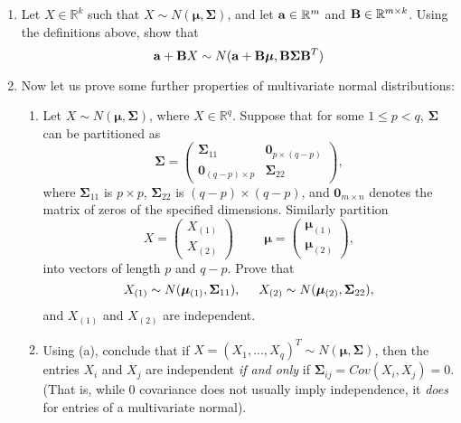 \documentclass[11pt]{article}
\begin{document}
\begin{enumerate}

\item Let $X \in \mathbb{R}^k$ such that $X \sim N(\bm{\mu}, \bm{\Sigma})$, and let ${\bf a} \in \mathbb{R}^m$ and ${\bf B} \in \mathbb{R}^{m \times k}$. Using the definitions above, show that
$${\bf a} + {\bf B} X \sim N({\bf a} + {\bf B} \bm{\mu}, {\bf B} \bm{\Sigma} {\bf B}^T)$$


\item Now let us prove some further properties of multivariate normal distributions:

\begin{enumerate}

\item Let $X \sim N(\bm{\mu}, \bm{\Sigma})$, where $X \in \mathbb{R}^q$. Suppose that for some $1 \leq p < q$, $\bm{\Sigma}$ can be partitioned as
$$\bm{\Sigma} = \begin{pmatrix}
\bm{\Sigma}_{11} & \bm{0}_{p \times (q - p)} \\
\bm{0}_{(q - p) \times p} & \bm{\Sigma}_{22}
\end{pmatrix},$$
where $\bm{\Sigma}_{11}$ is $p \times p$, $\bm{\Sigma}_{22}$ is $(q - p) \times (q - p)$, and $\bm{0}_{m \times n}$ denotes the matrix of zeros of the specified dimensions. Similarly partition 
$$X = \begin{pmatrix}
X_{(1)} \\
X_{(2)}
\end{pmatrix} \hspace{1cm} \bm{\mu} = \begin{pmatrix}
\bm{\mu}_{(1)} \\
\bm{\mu}_{(2)}
\end{pmatrix},$$
into vectors of length $p$ and $q - p$. Prove that 
$$X_{(1)} \sim N(\bm{\mu}_{(1)}, \bm{\Sigma}_{11}), \hspace{0.5cm} X_{(2)} \sim N(\bm{\mu}_{(2)}, \bm{\Sigma}_{22}),$$
and $X_{(1)}$ and $X_{(2)}$ are independent.

\item Using (a), conclude that if $X = (X_1,...,X_q)^T \sim N(\bm{\mu}, \bm{\Sigma})$, then the entries $X_i$ and $X_j$ are independent \textit{if and only} if $\bm{\Sigma}_{ij} = Cov(X_i, X_j) = 0$. (That is, while 0 covariance does not usually imply independence, it \textit{does} for entries of a multivariate normal).

\end{enumerate}


\end{enumerate}
\end{document}
